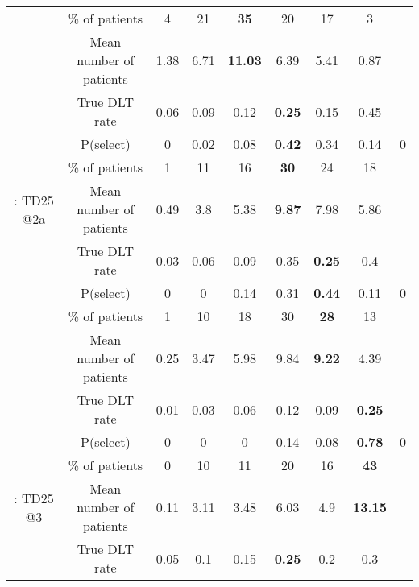 \begin{table}[h!]
\begin{singlespace}
{\begin{tabular}[t]{ccccccccc}
			\rowcolor{gray!6}   & \% of patients & 4 & 21 & \textbf{35} & 20 & 17 & 3 & \\
			
			\rowcolor{gray!6}  \multirow{-4}{*}{\centering\arraybackslash 11: TD25 @1} & Mean number of patients & 1.38 & 6.71 & \textbf{11.03} & 6.39 & 5.41 & 0.87 & \\
			\cmidrule{1-9}
			& True DLT rate & 0.06 & 0.09 & 0.12 & \textbf{0.25} & 0.15 & 0.45 & \\
			
			& P(select) & 0 & 0.02 & 0.08 & \textbf{0.42} & 0.34 & 0.14 & 0\\
			
			& \% of patients & 1 & 11 & 16 & \textbf{30} & 24 & 18 & \\
			
			\multirow{-4}{*}{\centering\arraybackslash 12: TD25 @2a} & Mean number of patients & 0.49 & 3.8 & 5.38 & \textbf{9.87} & 7.98 & 5.86 & \\
			\cmidrule{1-9}
			\rowcolor{gray!6}   & True DLT rate & 0.03 & 0.06 & 0.09 & 0.35 & \textbf{0.25} & 0.4 & \\
			
			\rowcolor{gray!6}   & P(select) & 0 & 0 & 0.14 & 0.31 & \textbf{0.44} & 0.11 & 0\\
			
			\rowcolor{gray!6}   & \% of patients & 1 & 10 & 18 & 30 & \textbf{28} & 13 & \\
			
			\rowcolor{gray!6}  \multirow{-4}{*}{\centering\arraybackslash 13: TD25 @2b} & Mean number of patients & 0.25 & 3.47 & 5.98 & 9.84 & \textbf{9.22} & 4.39 & \\
			\cmidrule{1-9}
			& True DLT rate & 0.01 & 0.03 & 0.06 & 0.12 & 0.09 & \textbf{0.25} & \\
			
			& P(select) & 0 & 0 & 0 & 0.14 & 0.08 & \textbf{0.78} & 0\\
			
			& \% of patients & 0 & 10 & 11 & 20 & 16 & \textbf{43} & \\
			
			\multirow{-4}{*}{\centering\arraybackslash 14: TD25 @3} & Mean number of patients & 0.11 & 3.11 & 3.48 & 6.03 & 4.9 & \textbf{13.15} & \\
			\cmidrule{1-9}
			\rowcolor{gray!6}   & True DLT rate & 0.05 & 0.1 & 0.15 & \textbf{0.25} & 0.2 & 0.3 & \\
			

\end{tabular}}
\end{singlespace}
\end{table}
